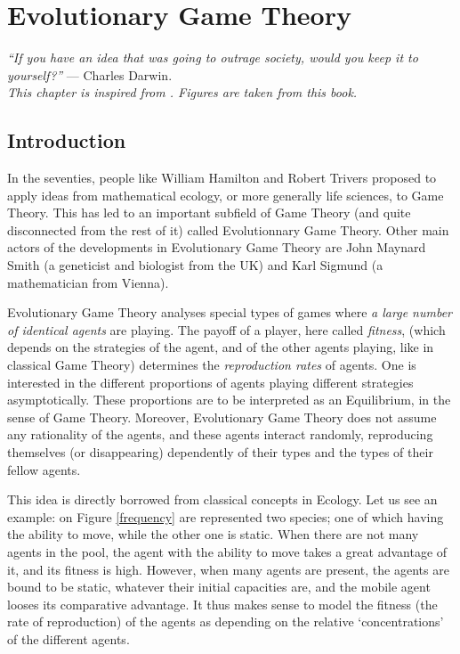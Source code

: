 \ifx \globalmark \undefined %

\else
\fi


\chapter{Evolutionary Game Theory}
\label{chap:Evol}
{\large{\itshape
``If you have an idea that was going to outrage society, would you keep it to yourself?''} --- Charles Darwin.\\
}
  {\small{\itshape
This chapter is inspired from \cite{NoED}.  Figures are taken from this book.}\\
}
\emph{}

\section{Introduction}
In the seventies, people like
William Hamilton and Robert Trivers proposed to apply ideas from mathematical ecology,
or more generally life sciences, to Game Theory.  This has led to an important subfield of Game Theory (and quite disconnected from the rest of it)
called Evolutionnary Game Theory. Other main actors of the developments in Evolutionary Game Theory are John Maynard Smith
 \cite{SmPrTLOA} (a geneticist and biologist from the UK) and Karl Sigmund (a mathematician from Vienna).

Evolutionary Game Theory analyses special types of games where \emph{a large number of identical agents} are playing.
The payoff of a player, here called \emph{fitness}, (which depends on the strategies of the agent, and of the other agents playing,
like in classical Game Theory) determines the \emph{reproduction rates} of agents.
One is interested in the different proportions of agents playing different strategies asymptotically.
 These proportions are to be interpreted as an Equilibrium, in the sense of Game Theory.
 Moreover, Evolutionary Game Theory does not assume any rationality of the agents, and these agents interact randomly, reproducing themselves (or disappearing) dependently of their types and the types of their fellow agents.

This idea is directly borrowed from classical concepts in Ecology. Let us see an example: on Figure \ref{frequency} are represented two species; one of which having the ability to move, while the other one is static.  When there are not many agents in the pool, the agent with the ability to move takes a great advantage of it, and its fitness is high.  However, when many agents are present, the agents are bound to be static, whatever their initial capacities are, and the mobile agent looses its comparative advantage.  It thus makes sense to model the fitness (the rate of reproduction) of the agents as depending on the relative `concentrations' of the different agents.

